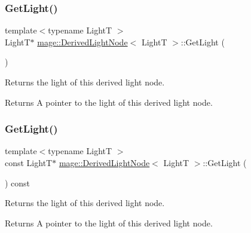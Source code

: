 \hypertarget{classmage_1_1_derived_light_node_a1f45fa421b75d663a360bfdd518a1a1d}{}\label{classmage_1_1_derived_light_node_a1f45fa421b75d663a360bfdd518a1a1d} 
\subsubsection{\texorpdfstring{Get\+Light()}{GetLight()}\hspace{0.1cm}{\footnotesize\ttfamily [1/2]}}
{\footnotesize\ttfamily template$<$typename LightT $>$ \\
LightT$\ast$ \hyperlink{classmage_1_1_derived_light_node}{mage\+::\+Derived\+Light\+Node}$<$ LightT $>$\+::Get\+Light (\begin{DoxyParamCaption}{ }\end{DoxyParamCaption})\hspace{0.3cm}{\ttfamily [noexcept]}}

Returns the light of this derived light node.

\begin{DoxyReturn}{Returns}
A pointer to the light of this derived light node. 
\end{DoxyReturn}
\hypertarget{classmage_1_1_derived_light_node_a61ace20169a3924d42abc163ebddc19b}{}\label{classmage_1_1_derived_light_node_a61ace20169a3924d42abc163ebddc19b} 
\subsubsection{\texorpdfstring{Get\+Light()}{GetLight()}\hspace{0.1cm}{\footnotesize\ttfamily [2/2]}}
{\footnotesize\ttfamily template$<$typename LightT $>$ \\
const LightT$\ast$ \hyperlink{classmage_1_1_derived_light_node}{mage\+::\+Derived\+Light\+Node}$<$ LightT $>$\+::Get\+Light (\begin{DoxyParamCaption}{ }\end{DoxyParamCaption}) const\hspace{0.3cm}{\ttfamily [noexcept]}}

Returns the light of this derived light node.

\begin{DoxyReturn}{Returns}
A pointer to the light of this derived light node. 
\end{DoxyReturn}
\hypertarget{classmage_1_1_derived_light_node_ad4a81ae2a671d6c278c74dead4660949}{}\label{classmage_1_1_derived_light_node_ad4a81ae2a671d6c278c74dead4660949} 

